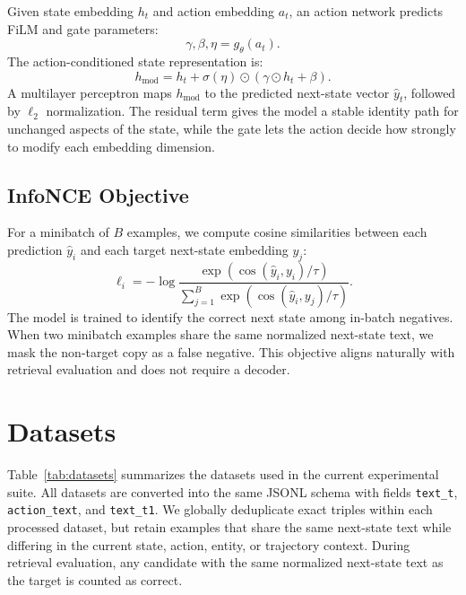 \documentclass{article}
\begin{document}
Given state embedding $h_t$ and action embedding $a_t$, an action network predicts FiLM and gate parameters:
\begin{equation}
  \gamma, \beta, \eta = g_\theta(a_t).
\end{equation}
The action-conditioned state representation is:
\begin{equation}
  h_{\mathrm{mod}} = h_t + \sigma(\eta) \odot (\gamma \odot h_t + \beta).
\end{equation}
A multilayer perceptron maps $h_{\mathrm{mod}}$ to the predicted next-state vector $\hat{y}_t$, followed by $\ell_2$ normalization. The residual term gives the model a stable identity path for unchanged aspects of the state, while the gate lets the action decide how strongly to modify each embedding dimension.

\subsection{InfoNCE Objective}

For a minibatch of $B$ examples, we compute cosine similarities between each prediction $\hat{y}_i$ and each target next-state embedding $y_j$:
\begin{equation}
  \ell_i = -\log \frac{\exp(\cos(\hat{y}_i,y_i)/\tau)}
  {\sum_{j=1}^{B}\exp(\cos(\hat{y}_i,y_j)/\tau)}.
\end{equation}
The model is trained to identify the correct next state among in-batch negatives. When two minibatch examples share the same normalized next-state text, we mask the non-target copy as a false negative. This objective aligns naturally with retrieval evaluation and does not require a decoder.

\section{Datasets}

Table~\ref{tab:datasets} summarizes the datasets used in the current experimental suite. All datasets are converted into the same JSONL schema with fields \texttt{text\_t}, \texttt{action\_text}, and \texttt{text\_t1}. We globally deduplicate exact triples within each processed dataset, but retain examples that share the same next-state text while differing in the current state, action, entity, or trajectory context. During retrieval evaluation, any candidate with the same normalized next-state text as the target is counted as correct.
\end{document}
